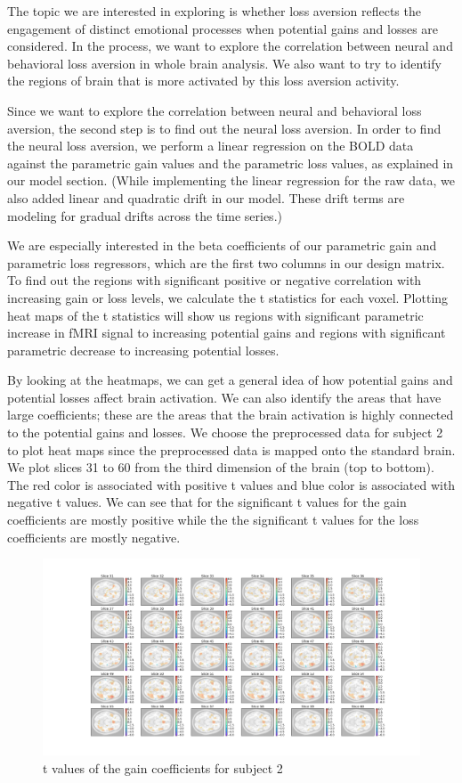 The topic we are interested in exploring is whether loss aversion reflects 
the engagement of distinct emotional processes when potential gains and 
losses are considered. In the process, we want to explore the correlation 
between neural and behavioral loss aversion in whole brain analysis. We also 
want to try to identify the regions of brain that is more activated by this 
loss aversion activity.

Since we want to explore the correlation between neural and behavioral loss 
aversion, the second step is to find out the neural loss aversion. In order 
to find the neural loss aversion, we perform a linear regression on the BOLD 
data against the parametric gain values and the parametric loss values, as 
explained in our model section. (While implementing the linear regression for 
the raw data, we also added linear and quadratic drift in our model. These 
drift terms are modeling for gradual drifts across the time series.)

We are especially interested in the beta coefficients of our parametric gain 
and parametric loss regressors, which are the first two columns in our design 
matrix. To find out the regions with significant positive or negative 
correlation with increasing gain or loss levels, we calculate the t statistics 
for each voxel. Plotting heat maps of the t statistics will show us regions 
with significant parametric increase in fMRI signal to increasing potential 
gains and regions with significant parametric decrease to increasing potential 
losses.

By looking at the heatmaps, we can get a general idea of how potential gains 
and potential losses affect brain activation. We can also identify the areas 
that have large coefficients; these are the areas that the brain activation is 
highly connected to the potential gains and losses. We choose the preprocessed 
data for subject 2 to plot heat maps since the preprocessed data is mapped 
onto the standard brain. We plot slices 31 to 60 from the third dimension of 
the brain (top to bottom). The red color is associated with positive t values 
and blue color is associated with negative t values. We can see that for the 
significant t values for the gain coefficients are mostly positive while the
the significant t values for the loss coefficients are mostly negative.

\begin{figure}[H]
    \centering
        \includegraphics[scale=0.42]{figures/t_gain_standard_sub2.png}
    \caption{t values of the gain coefficients for subject 2}
\end{figure}

